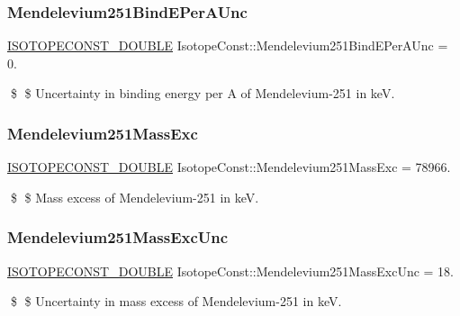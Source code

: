\subsubsection{\texorpdfstring{Mendelevium251\+Bind\+E\+Per\+A\+Unc}{Mendelevium251BindEPerAUnc}}
{\footnotesize\ttfamily \mbox{\hyperlink{group___isotope_const-_macros_ga8f45a7272ce02c0b4c65c44636ed719a}{I\+S\+O\+T\+O\+P\+E\+C\+O\+N\+S\+T\+\_\+\+D\+O\+U\+B\+LE}} Isotope\+Const\+::\+Mendelevium251\+Bind\+E\+Per\+A\+Unc = 0.}

\$ \$ Uncertainty in binding energy per A of Mendelevium-\/251 in keV. \mbox{\label{group___isotope_const-_mendelevium-_md251_ga2037d92f257f8a801e0714dcf3b5c105}} 
\subsubsection{\texorpdfstring{Mendelevium251\+Mass\+Exc}{Mendelevium251MassExc}}
{\footnotesize\ttfamily \mbox{\hyperlink{group___isotope_const-_macros_ga8f45a7272ce02c0b4c65c44636ed719a}{I\+S\+O\+T\+O\+P\+E\+C\+O\+N\+S\+T\+\_\+\+D\+O\+U\+B\+LE}} Isotope\+Const\+::\+Mendelevium251\+Mass\+Exc = 78966.}

\$ \$ Mass excess of Mendelevium-\/251 in keV. \mbox{\label{group___isotope_const-_mendelevium-_md251_ga57760e3234da1d4c12d034697742eac1}} 
\subsubsection{\texorpdfstring{Mendelevium251\+Mass\+Exc\+Unc}{Mendelevium251MassExcUnc}}
{\footnotesize\ttfamily \mbox{\hyperlink{group___isotope_const-_macros_ga8f45a7272ce02c0b4c65c44636ed719a}{I\+S\+O\+T\+O\+P\+E\+C\+O\+N\+S\+T\+\_\+\+D\+O\+U\+B\+LE}} Isotope\+Const\+::\+Mendelevium251\+Mass\+Exc\+Unc = 18.}

\$ \$ Uncertainty in mass excess of Mendelevium-\/251 in keV. \mbox{\label{group___isotope_const-_mendelevium-_md251_gaded740f75ff377e3164b8083197b2f95}} 
